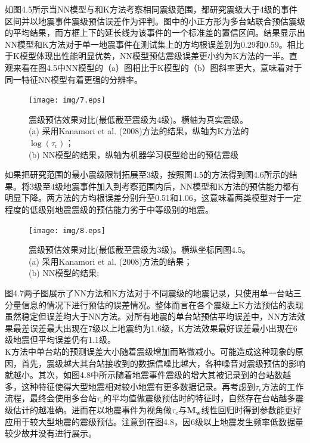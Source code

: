 \indent 如图4.5所示当NN模型与和K方法考察相同震级范围，都研究震级大于4级的事件区间并以地震事件震级预估误差作为评判。图中的小正方形为多台站联合预估震级的平均结果，而方框上下的延长线为该事件的一个标准差的置信区间。结果显示出NN模型和K方法对于单一地震事件在测试集上的方均根误差别为0.29和0.59。相比于K模型体现出性能明显优势，NN模型预估震级误差更小约为K方法的一半。直观来看在图4.5中NN模型的（a）图相比于K模型的（b）图斜率更大，意味着对于同一特征NN模型有着更强的分辨率。\\
\begin{figure}[!h]%
	\centering  %
	\texttt{[image: img/7.eps]}  %
	\caption{震级预估效果对比(最低截至震级为4级)。横轴为真实震级。\\
(a) 采用Kanamori et al. (2008)方法的结果，纵轴为K方法的$\log \left(\tau_{\mathrm{c}}\right)$；\\(b) NN模型的结果，纵轴为机器学习模型给出的预估震级}  %
	\label{fig:mcmthesis-logo}   %
\end{figure}
\indent 如果把研究范围的最小震级限制拓展至3级，按照图4.5的方法得到图4.6所示的结果。将3级至4级地震事件加入到考察范围内后，NN模型和K方法的预估能力都有明显下降。两方法的方均根误差分别升至0.51和1.06，这意味着两类模型对于一定程度的低级别地震震级的预估能力劣于中等级别的地震。\\
\begin{figure}[!h]%
	\centering  %
	\texttt{[image: img/8.eps]}  %
	\caption{震级预估效果对比(最低截至震级为3级)。横纵坐标同图4.5。\\
(a) 采用Kanamori et al. (2008)方法的结果；\\(b) NN模型的结果;}  %
	\label{fig:mcmthesis-logo}   %
\end{figure}
\indent 图4.7两子图展示了NN方法和K方法对于不同震级的地震记录，只使用单一台站三分量信息的情况下进行预估的误差情况。整体而言在各个震级上K方法预估的表现虽然稳定但误差均大于NN方法。对所有地震的单台站预估平均误差中，NN方法效果最差误差最大出现在7级以上地震约为1.6级，K方法效果最好误差最小出现在6级地震但平均误差仍有1.1级。\\
\indent K方法中单台站的预测误差大小随着震级增加而略微减小。可能造成这种现象的原因，首先，震级越大其台站接收到的数据信噪比越大，各种噪音对震级预估的影响就越小。其次，如图4.8中所示随着地震事件震级的增大其被记录到的台站数越多，这种特征使得大型地震相对较小地震有更多数据记录。再考虑到$\tau_{\mathrm{c}}$方法的工作流程，最终会使用多台站$\tau_{\mathrm{c}}$的平均值做震级预估时的特征时，自然存在台站越多震级估计的越准确。进而在以地震事件为视角做$\tau_{\mathrm{c}}$与$\mathbf{M}_{\mathbf{w}}$线性回归时得到参数能更好应用于较大型地震的震级预估。注意到在图4.8，因6级以上地震发生频率低数据量较少故并没有进行展示。\\
